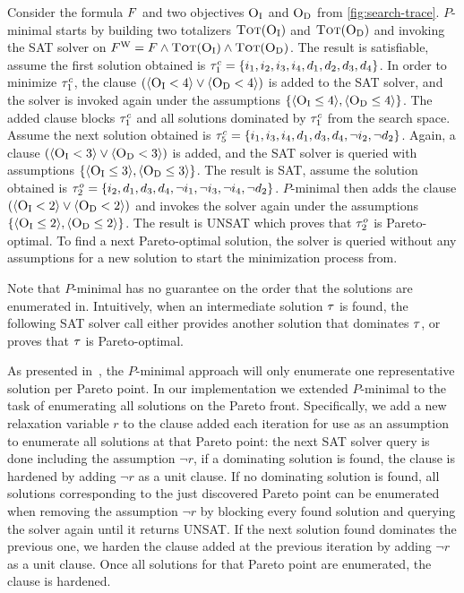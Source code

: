 \begin{example}\label{ex:pmin}
  Consider the formula $F$ and two objectives $\textsc{O}_{\text{I}}$ and $\textsc{O}_{\text{D}}$ from \cref{fig:search-trace}.
  $P$-minimal starts by building two totalizers $\textsc{Tot}(\textsc{O}_{\text{I}})$ and $\textsc{Tot}(\textsc{O}_{\text{D}})$ and invoking the SAT solver on $F^\text{W} = F \land \textsc{Tot}(\textsc{O}_{\text{I}}) \land \textsc{Tot}(\textsc{O}_{\text{D}})$.
  The result is satisfiable, assume the first solution obtained is $\tau^c_1 = \{i_1,\allowbreak i_2,\allowbreak i_3,\allowbreak i_4,\allowbreak d_1,\allowbreak d_2,\allowbreak d_3,\allowbreak d_4\}$. 
  In order to minimize $\tau^c_1$, the clause $(\langle \textsc{O}_{\text{I}} < 4 \rangle \lor \langle \textsc{O}_{\text{D}} < 4 \rangle)$ is added to the SAT solver, and the solver is invoked again under the assumptions $\{ \langle \textsc{O}_{\text{I}} \leq 4 \rangle, \langle \textsc{O}_{\text{D}} \leq 4 \rangle \}$.
  The added clause blocks $\tau^c_1$ and all solutions dominated by $\tau^c_1$ from the search space.
  Assume the next solution obtained is $\tau^c_5 = \{i_1,\allowbreak i_3,\allowbreak i_4,\allowbreak d_1,\allowbreak d_3,\allowbreak d_4,\allowbreak \lnot i_2,\allowbreak \lnot d_2\}$. 
  Again, a clause $(\langle \textsc{O}_{\text{I}} < 3 \rangle \lor \langle \textsc{O}_{\text{D}} < 3 \rangle)$ is added, and the SAT solver is queried with assumptions $\{ \langle \textsc{O}_{\text{I}} \leq 3 \rangle, \langle \textsc{O}_{\text{D}} \leq 3 \rangle \}$.
  The result is SAT, assume the solution obtained is $\tau^o_2 = \{i_2,\allowbreak d_1,\allowbreak d_3,\allowbreak d_4,\allowbreak \lnot i_1,\allowbreak \lnot i_3,\allowbreak \lnot i_4,\allowbreak \lnot d_2\}$. 
  $P$-minimal then adds the clause $(\langle \textsc{O}_{\text{I}} < 2 \rangle \lor \langle \textsc{O}_{\text{D}} < 2 \rangle)$ and invokes the solver again under the assumptions $\{ \langle \textsc{O}_{\text{I}} \leq 2 \rangle, \langle \textsc{O}_{\text{D}} \leq 2 \rangle \}$.
  The result is UNSAT which proves that $\tau^o_2$ is Pareto-optimal. 
  To find a next Pareto-optimal solution, the solver is queried without any assumptions for a new solution to start the minimization process from.
\end{example}

Note that $P$-minimal has no guarantee on the order that the solutions are enumerated in. 
Intuitively, when an intermediate solution $\tau$ is found, the following SAT solver call either provides another solution that dominates $\tau$, or proves that $\tau$ is Pareto-optimal.  

As presented in~\cite{DBLP:conf/cp/SohBTB17}, the $P$-minimal approach will only enumerate one representative solution per Pareto point.
In our implementation we extended $P$-minimal to the task of enumerating all solutions on the Pareto front.
Specifically, we add a new relaxation variable $r$ to the clause added each iteration for use as an assumption to enumerate all solutions at that Pareto point:
the next SAT solver query is done including the assumption $\lnot r$, if a dominating solution is found, the clause is hardened by adding $\lnot r$ as a unit clause.
If no dominating solution is found, all solutions corresponding to the just discovered Pareto point can be enumerated when removing the assumption $\lnot r$ by blocking every found solution and querying the solver again until it returns UNSAT.
If the next solution found dominates the previous one, we harden the clause added at the previous iteration by adding $\lnot r$ as a unit clause.
Once all solutions for that Pareto point are enumerated, the clause is hardened.

